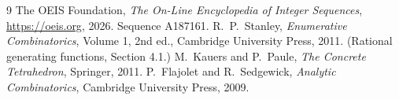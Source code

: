 \documentclass[11pt,a4paper]{article}
\theoremstyle{plain}
\theoremstyle{definition}
\begin{document}
\begin{thebibliography}{9}
 The OEIS Foundation, \emph{The On-Line Encyclopedia of Integer
Sequences}, \url{https://oeis.org}, 2026. Sequence A187161.
 R.~P.~Stanley, \emph{Enumerative Combinatorics}, Volume 1, 2nd ed.,
Cambridge University Press, 2011. (Rational generating functions, Section 4.1.)
 M.~Kauers and P.~Paule, \emph{The Concrete Tetrahedron}, Springer, 2011.
 P.~Flajolet and R.~Sedgewick, \emph{Analytic Combinatorics}, Cambridge
University Press, 2009.
\end{thebibliography}
\end{document}
